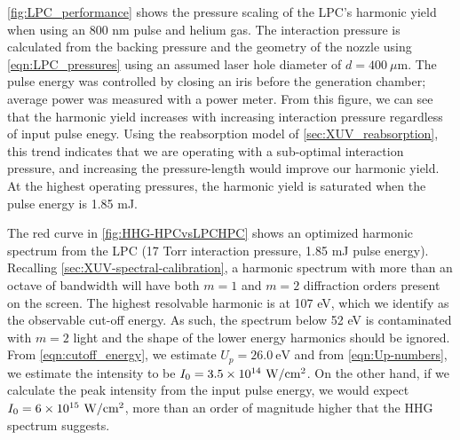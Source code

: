 \cref{fig:LPC_performance} shows the pressure scaling of the LPC's harmonic yield when using an 800 nm pulse and helium gas. The interaction pressure is calculated from the backing pressure and the geometry of the nozzle using \cref{eqn:LPC_pressures} using an assumed laser hole diameter of $d = 400 \ \mu$m. The pulse energy was controlled by closing an iris before the generation chamber; average power was measured with a power meter. From this figure, we can see that the harmonic yield increases with increasing interaction pressure regardless of input pulse enegy. Using the reabsorption model of \cref{sec:XUV_reabsorption}, this trend indicates that we are operating with a sub-optimal interaction pressure, and increasing the pressure-length would improve our harmonic yield. At the highest operating pressures, the harmonic yield is saturated when the pulse energy is 1.85 mJ.

The red curve in \cref{fig:HHG-HPCvsLPCHPC} shows an optimized harmonic spectrum from the LPC (17 Torr interaction pressure, 1.85 mJ pulse energy). Recalling \cref{sec:XUV-spectral-calibration}, a harmonic spectrum with more than an octave of bandwidth will have both $m=1$ and $m=2$ diffraction orders present on the screen. The highest resolvable harmonic is at 107 eV, which we identify as the observable cut-off energy. As such, the spectrum below 52 eV is contaminated with ${m=2}$ light and the shape of the lower energy harmonics should be ignored. From \cref{eqn:cutoff_energy}, we estimate $U_p = 26.0 \ \textrm{eV}$ and from \cref{eqn:Up-numbers}, we estimate the intensity to be ${I_0 = 3.5 \times 10^{14} \ \textrm{W/cm\textsuperscript{2}}}$. On the other hand, if we calculate the peak intensity from the input pulse energy, we would expect ${I_0 = 6 \times 10^{15} \textrm{ W/cm\textsuperscript{2}}}$, more than an order of magnitude higher that the HHG spectrum suggests.


